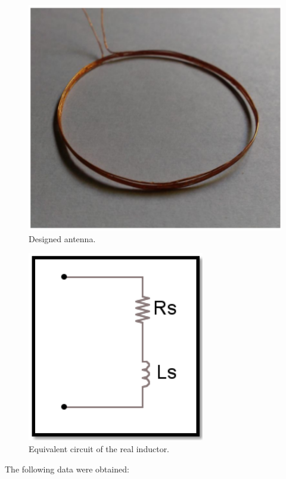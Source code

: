\documentclass{article} %
\begin{document}
\begin{multicols}{2}
\begin{figure}[H]
\centering
\includegraphics[scale=0.3]{Images/ImagenesTesina/antena/Antena.png}
\caption{Designed antenna.}
\label{fig:antena}
\end{figure}

\begin{figure}[H]
\centering
\includegraphics[scale=0.4]{Images/ImagenesTesina/antena/Equivalente_Bobina_Serie.png}
\caption{Equivalent circuit of the real inductor.}
\label{fig:L_real}
\end{figure}


The following data were obtained:


\end{multicols}
\end{document}
